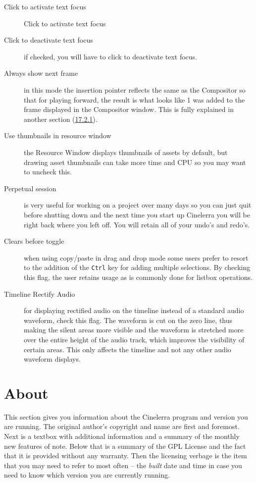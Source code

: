 \begin{description}
    \item[Click to activate text focus] Click to activate text focus
    \item [Click to deactivate text focus] if checked, you will have to click to deactivate text focus.
    \item[Always show next frame] in this mode the insertion pointer reflects the same as the Compositor so that for playing forward, the result is what looks like 1 was added to the frame displayed in the Compositor window.  This is fully explained in another section (\hyperref[sub:playing_seeking]{17.2.1}).
    \item[Use thumbnails in resource window] the Resource Window displays thumbnails of assets by default, but drawing asset thumbnails can take more time and CPU so you may want to uncheck this.
    \item[Perpetual session] is very useful for working on a project over many days so you can just quit before
    shutting down and the next time you start up Cinelerra you will be right back where you left off. You
    will retain all of your undo's and redo's.
    \item[Clears before toggle] when using copy/paste in drag and drop mode some users prefer to resort to the addition of the \texttt{Ctrl} key for adding multiple selections.  By checking this flag, the user retains usage as is commonly done for listbox operations.
    \item[Timeline Rectify Audio] for displaying rectified audio on the timeline instead of a standard audio waveform, check this flag.  The waveform is cut on the zero line, thus making the silent areas more visible and the waveform is stretched more over the entire height of the audio track, which improves the visibility of certain areas. This only affects the timeline and not any other audio waveform displays.
\end{description}

\section{About}%
\label{sec:about}

This section gives you information about the Cinelerra program and version you are running.  The original author’s copyright and name are first and foremost.  Next is a textbox with additional information and a summary of the monthly new features of note. Below that is a summary of the GPL License and the fact that it is provided without any warranty.  Then the licensing verbage is the item that you may need to refer to most often -- the \textit{built} date and time in case you need to know which version you are currently running.


